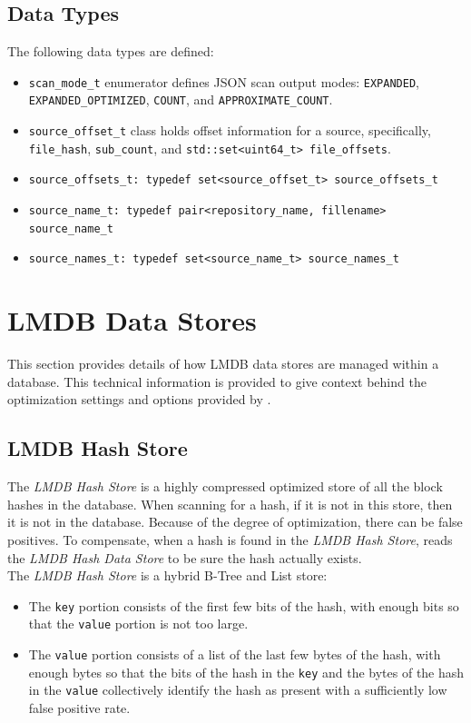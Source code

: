 \documentclass[11pt,fleqn]{article} %
\begin{document}
\subsection{Data Types}

The following data types are defined:

\begin{itemize}
\item \verb+scan_mode_t+ enumerator defines JSON scan output modes: \verb+EXPANDED+, \verb+EXPANDED_OPTIMIZED+, \verb+COUNT+, and \verb+APPROXIMATE_COUNT+.
\item \verb+source_offset_t+ class holds offset information for a source, specifically, \verb+file_hash+, \verb+sub_count+, and \verb+std::set<uint64_t> file_offsets+.
\item \verb+source_offsets_t: typedef set<source_offset_t> source_offsets_t+
\item \verb+source_name_t: typedef pair<repository_name, fillename> source_name_t+
\item \verb+source_names_t: typedef set<source_name_t> source_names_t+
\end{itemize}

\section{LMDB Data Stores}
\label{LMDBDataStores}
This section provides details of how LMDB data stores are managed within a \hdb database. This technical information is provided to give context behind the optimization settings and options provided by \hdb.\\

\subsection{LMDB Hash Store}
The \textit{LMDB Hash Store} is a highly compressed optimized store of all the block hashes in the database.  When scanning for a hash, if it is not in this store, then it is not in the database.  Because of the degree of optimization, there can be false positives.  To compensate, when a hash is found in the \textit{LMDB Hash Store}, \hdb reads the \textit{LMDB Hash Data Store} to be sure the hash actually exists.\\

The \textit{LMDB Hash Store} is a hybrid B-Tree and List store:
\begin{itemize}
\item The \verb+key+ portion consists of the first few bits of the hash, with enough bits so that the \verb+value+ portion is not too large.
\item The \verb+value+ portion consists of a list of the last few bytes of the hash, with enough bytes so that the bits of the hash in the \verb+key+ and the bytes of the hash in the \verb+value+ collectively identify the hash as present with a sufficiently low false positive rate.
\end{itemize}
\end{document}
